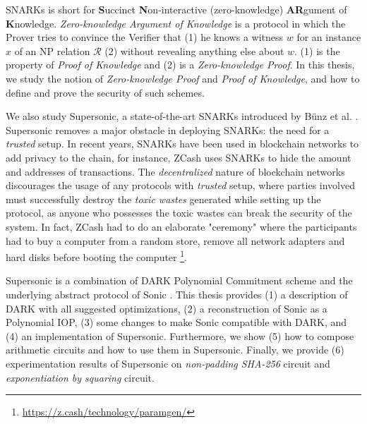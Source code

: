 \begin{EnAbstract}
SNARKs is short for \textbf{S}uccinct \textbf{N}on-interactive (zero-knowledge) \textbf{AR}gument of \textbf{K}nowledge. \textit{Zero-knowledge Argument of Knowledge} is a protocol in which the Prover tries to convince the Verifier that (1) he knows a witness $w$ for an instance $x$ of an NP relation $\mathcal{R}$ (2) without revealing anything else about $w$. (1) is the property of \textit{Proof of Knowledge} and (2) is a \textit{Zero-knowledge 
Proof}. In this thesis, we study the notion of \textit{Zero-knowledge Proof} and \textit{Proof of Knowledge}, and how to define and prove the security of such schemes.

We also study Supersonic, a state-of-the-art SNARKs introduced by Bünz et al. \cite{bunz2020transparent}. Supersonic removes a major obstacle in deploying SNARKs: the need for a \textit{trusted} setup. In recent years, SNARKs have been used in blockchain networks to add privacy to the chain, for instance, ZCash uses SNARKs to hide the amount and addresses of transactions. The \textit{decentralized} nature of blockchain networks discourages the usage of any protocols with \textit{trusted} setup, where parties involved must successfully destroy the \textit{toxic wastes} generated while setting up the protocol, as anyone who possesses the toxic wastes can break the security of the system. In fact, ZCash had to do an elaborate "ceremony" where the participants had to buy a computer from a random store, remove all network adapters and hard disks before booting the computer \footnote{\url{https://z.cash/technology/paramgen/}}.

Supersonic is a combination of DARK Polynomial Commitment scheme \cite{bunz2020transparent} and the underlying abstract protocol of Sonic \cite{maller2019sonic}. This thesis provides (1) a description of DARK with all suggested optimizations, (2) a reconstruction of Sonic as a Polynomial IOP, (3) some changes to make Sonic compatible with DARK, and (4) an implementation of Supersonic. Furthermore, we show (5) how to compose arithmetic circuits and how to use them in Supersonic. Finally, we provide (6) experimentation results of Supersonic on \textit{non-padding SHA-256} circuit and \textit{exponentiation by squaring} circuit.

\end{EnAbstract}